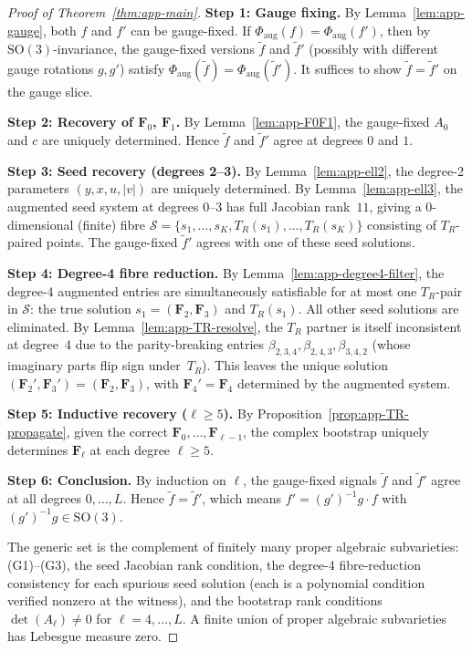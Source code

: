 \documentclass{article}
\theoremstyle{definition}
\theoremstyle{remark}
\newcommand{\SO}{\mathrm{SO}}
\theoremstyle{definition}
\begin{document}
\begin{proof}[Proof of Theorem~\ref{thm:app-main}]
\textbf{Step 1: Gauge fixing.}
By Lemma~\ref{lem:app-gauge}, both $f$ and $f'$ can be gauge-fixed.
If $\Phi_{\mathrm{aug}}(f) = \Phi_{\mathrm{aug}}(f')$, then by
$\SO(3)$-invariance, the gauge-fixed versions $\tilde{f}$ and $\tilde{f}'$
(possibly with different gauge rotations $g, g'$) satisfy
$\Phi_{\mathrm{aug}}(\tilde{f}) = \Phi_{\mathrm{aug}}(\tilde{f}')$.
It suffices to show $\tilde{f} = \tilde{f}'$ on the gauge slice.

\medskip
\textbf{Step 2: Recovery of $\mathbf{F}_0$, $\mathbf{F}_1$.}
By Lemma~\ref{lem:app-F0F1}, the gauge-fixed $A_0$ and $c$ are uniquely
determined. Hence $\tilde{f}$ and $\tilde{f}'$ agree at degrees $0$ and $1$.

\medskip
\textbf{Step 3: Seed recovery (degrees 2--3).}
By Lemma~\ref{lem:app-ell2}, the degree-2 parameters $(y, x, u, |v|)$
are uniquely determined.
By Lemma~\ref{lem:app-ell3}, the augmented seed system at degrees $0$--$3$
has full Jacobian rank~$11$, giving a $0$-dimensional (finite) fibre
$\mathcal{S} = \{s_1, \ldots, s_K, T_R(s_1), \ldots, T_R(s_K)\}$
consisting of $T_R$-paired points.
The gauge-fixed $\tilde{f}'$ agrees with one of these seed solutions.

\medskip
\textbf{Step 4: Degree-4 fibre reduction.}
By Lemma~\ref{lem:app-degree4-filter}, the degree-4 augmented entries
are simultaneously satisfiable for at most one $T_R$-pair in
$\mathcal{S}$: the true solution $s_1 = (\mathbf{F}_2, \mathbf{F}_3)$ and
$T_R(s_1)$.  All other seed solutions are eliminated.
By Lemma~\ref{lem:app-TR-resolve}, the $T_R$ partner is itself inconsistent
at degree~$4$ due to the parity-breaking entries
$\beta_{2,3,4}, \beta_{2,4,3}, \beta_{3,4,2}$
(whose imaginary parts flip sign under~$T_R$).
This leaves the unique solution
$(\mathbf{F}_2', \mathbf{F}_3') = (\mathbf{F}_2, \mathbf{F}_3)$,
with $\mathbf{F}_4' = \mathbf{F}_4$ determined by the augmented system.

\medskip
\textbf{Step 5: Inductive recovery ($\ell \ge 5$).}
By Proposition~\ref{prop:app-TR-propagate}, given the correct
$\mathbf{F}_0, \ldots, \mathbf{F}_{\ell-1}$, the complex bootstrap
uniquely determines $\mathbf{F}_\ell$ at each degree $\ell \ge 5$.

\medskip
\textbf{Step 6: Conclusion.}
By induction on $\ell$, the gauge-fixed signals $\tilde{f}$ and $\tilde{f}'$
agree at all degrees $0, \ldots, L$.
Hence $\tilde{f} = \tilde{f}'$, which means $f' = (g')^{-1} g \cdot f$
with $(g')^{-1} g \in \SO(3)$.

The generic set is the complement of finitely many proper algebraic
subvarieties: (G1)--(G3), the seed Jacobian rank condition, the
degree-4 fibre-reduction consistency for each spurious seed solution
(each is a polynomial condition verified nonzero at the witness),
and the bootstrap rank conditions $\det(A_\ell) \ne 0$ for
$\ell = 4, \ldots, L$.
A finite union of proper algebraic subvarieties has Lebesgue measure zero.
\end{proof}
\end{document}
